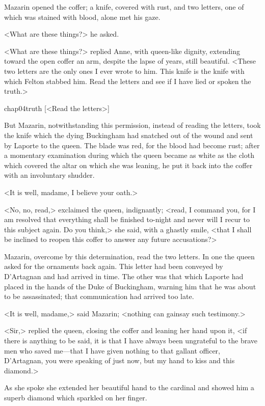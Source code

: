 Mazarin opened the coffer; a knife, covered with rust, and two letters, one of which was stained with blood, alone met his gaze.

<What are these things?> he asked.

<What are these things?> replied Anne, with queen-like dignity, extending toward the open coffer an arm, despite the lapse of years, still beautiful. <These two letters are the only ones I ever wrote to him. This knife is the knife with which Felton stabbed him. Read the letters and see if I have lied or spoken the truth.>


\begin{bwbigpic}
	[\basicscale] 
	{chap04truth}
	[<Read the letters>]
\end{bwbigpic}

But Mazarin, notwithstanding this permission, instead of reading the letters, took the knife which the dying Buckingham had snatched out of the wound and sent by Laporte to the queen. The blade was red, for the blood had become rust; after a momentary examination during which the queen became as white as the cloth which covered the altar on which she was leaning, he put it back into the coffer with an involuntary shudder.

<It is well, madame, I believe your oath.>

<No, no, read,> exclaimed the queen, indignantly; <read, I command you, for I am resolved that everything shall be finished to-night and never will I recur to this subject again. Do you think,> she said, with a ghastly smile, <that I shall be inclined to reopen this coffer to answer any future accusations?>

Mazarin, overcome by this determination, read the two letters. In one the queen asked for the ornaments back again. This letter had been conveyed by D'Artagnan and had arrived in time. The other was that which Laporte had placed in the hands of the Duke of Buckingham, warning him that he was about to be assassinated; that communication had arrived too late.

<It is well, madame,> said Mazarin; <nothing can gainsay such testimony.>

<Sir,> replied the queen, closing the coffer and leaning her hand upon it, <if there is anything to be said, it is that I have always been ungrateful to the brave men who saved me—that I have given nothing to that gallant officer, D'Artagnan, you were speaking of just now, but my hand to kiss and this diamond.>

As she spoke she extended her beautiful hand to the cardinal and showed him a superb diamond which sparkled on her finger.

